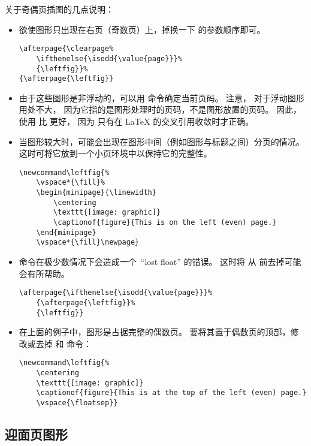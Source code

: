 关于奇偶页插图的几点说明：
\begin{itemize}
	\item 欲使图形只出现在右页（奇数页）上，掉换一下  的参数顺序即可。
\begin{lstlisting}
\afterpage{\clearpage% 
	\ifthenelse{\isodd{\value{page}}}% 
	{\leftfig}}%
{\afterpage{\leftfig}}
\end{lstlisting}
	\item 由于这些图形是非浮动的，可以用  命令确定当前页码。
	注意， 对于浮动图形用处不大，
	因为它指的是图形处理时的页码，不是图形放置的页码。
	因此，使用  比  更好，
	因为  只有在 \LaTeX{} 的交叉引用收敛时才正确。
	
	\item 当图形较大时，可能会出现在图形中间（例如图形与标题之间）分页的情况。
	这时可将它放到一个小页环境中以保持它的完整性。
\begin{lstlisting}
\newcommand\leftfig{%
	\vspace*{\fill}%
	\begin{minipage}{\linewidth}
		\centering
		\texttt{[image: graphic]}
		\captionof{figure}{This is on the left (even) page.}
	\end{minipage}
	\vspace*{\fill}\newpage}
\end{lstlisting}

	\item {} 命令在极少数情况下会造成一个~``lost float'' 的错误。
	这时将  从  前去掉可能会有所帮助。
\begin{lstlisting}
\afterpage{\ifthenelse{\isodd{\value{page}}}%
	{\afterpage{\leftfig}}%
	{\leftfig}}
\end{lstlisting}
	
	\item 在上面的例子中，图形是占据完整的偶数页。
	要将其置于偶数页的顶部，修改或去掉  和  命令：
\begin{lstlisting}
\newcommand\leftfig{%
	\centering
	\texttt{[image: graphic]}
	\captionof{figure}{This is at the top of the left (even) page.}
	\vspace{\floatsep}}
\end{lstlisting}

\end{itemize}

\subsection{迎面页图形}\label{ssec:fig-facingpage}

